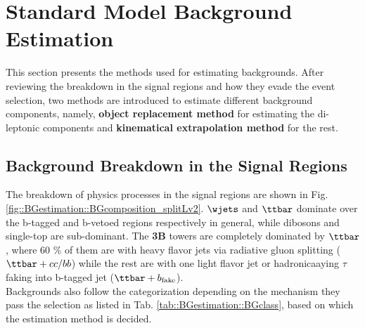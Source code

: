 \section{Standard Model Background Estimation} 
This section presents the methods used for estimating backgrounds. After reviewing the breakdown in the signal regions and how they evade the event selection, two methods are introduced to estimate different background components, namely, \textbf{object replacement method} for estimating the di-leptonic components and \textbf{kinematical extrapolation method} for the rest.


\subsection{Background Breakdown in the Signal Regions} \label{sec::BGcomposition}
The breakdown of physics processes in the signal regions are shown in Fig. \ref{fig::BGestimation::BGcomposition_splitLv2}. $\wjets$ and $\ttbar$ dominate over the b-tagged and b-vetoed regions respectively in general, while dibosons and single-top are sub-dominant. The \textbf{3B} towers are completely dominated by $\ttbar$, where 60 $\%$ of them are with heavy flavor jets via radiative gluon splitting ($\ttbar+cc/bb$) while the rest are with one light flavor jet or hadronicaaying $\tau$ faking into b-tagged jet ($\ttbar+b_{\mathrm{fake}}$).  \\

Backgrounds also follow the categorization depending on the mechanism they pass the selection as listed in Tab. \ref{tab::BGestimation::BGclass}, based on which the estimation method is decided.

